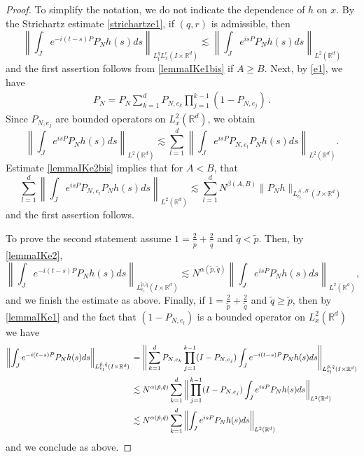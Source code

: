 \documentclass[aihp]{imsart}
\numberwithin{equation}{section}
\theoremstyle{plain}
\theoremstyle{remark}
\newcommand{\R}{\mathbb{R}}
\begin{document}
\begin{proof}
To simplify the notation, we do not indicate the dependence of $h$ on $x$. 
By the Strichartz estimate \eqref{strichartze1}, if $(q,r)$ is admissible, then
$$\left\|\int_J e^{-i(t-s) P} P_N h(s) ds\right\|_{L_t^q L_x^r (I\times \R^d)} \lesssim \left\|\int_J e^{is P } P_N h(s) ds\right\|_{L^2 (\R^d)} $$
and the first assertion follows from \eqref{lemmaIKe1bis} if $A \geq B$.
Next, by \eqref{e1}, we have
\begin{align*}
P_N 
= P_{N} \sum_{k = 1}^d P_{N, e_k} \prod_{j = 1}^{k - 1}(1 - P_{N, e_j}) \,.
\end{align*}
Since $P_{N,e_j}$ are bounded operators on $L^2_x (\R^d )$, we obtain  
$$
\left\|\int_J e^{is P } P_N h(s) ds\right\|_{L^2 (\R^d )} \lesssim \sum^{d}_{l=1}\left\|\int_J e^{is P} P_{N,e_l} P_N h(s) ds\right\|_{L^2 (\R^d )}.
$$
 Estimate \eqref{lemmaIKe2bis} implies that for $ A < B$, that 
$$\sum_{l=1}^d  \left\|\int_J e^{is P} P_{N,e_l} P_N h(s) ds \right\|_{L^2 (\R^d )} \lesssim \sum_{l=1}^d N^{\beta (A,B)} \|P_N h\|_{L_{e_l}^{A^\prime ,B^\prime} (J\times \R^d )}$$
and the first assertion follows. 


To prove the second statement assume $1= \frac{2}{\tilde{p}} +\frac{2}{\tilde{q}}$ and $\tilde{q} < \tilde{p}$. Then, by 
\eqref{lemmaIKe2}, 
\begin{equation}
\label{line1}
\left\|\int_J e^{-i(t-s) P} P_N h(s) ds \right\|_{L_{e_l}^{\tilde p, \tilde q} (I\times \R^d)}\lesssim N^{\alpha ( \tilde{p},\tilde q)}  \left\|\int_J e^{is P } P_N h(s) ds \right \|_{L^2 (\R^d)} ,
\end{equation}
and we finish the estimate as above. Finally, if $1= \frac{2}{\tilde{p}} +\frac{2}{\tilde{q}}$ and $\tilde{q} \geq \tilde{p}$, then by \eqref{lemmaIKe1} and the fact that $(1-P_{N,e_l})$ is a bounded operator on $L^2_x (\R^d )$ we have 
\begin{equation*}
\left\|\int_J e^{-i(t-s) P} P_N h(s) ds \right\|_{L_{e_l}^{\tilde p, \tilde q} (I\times \R^d)} \\
\begin{aligned}[t]
&=  \Bigg\| \sum_{k = 1}^d P_{N, e_k} \prod_{j = 1}^{k-1} (I - P_{N, e_{j}}) \int_J e^{-i(t -s) P } P_N h(s) ds \Bigg\|_{L_{e_l}^{\tilde p, \tilde q} (I\times \R^d)} \\
&\lesssim N^{\alpha ( \tilde{p},\tilde q)} \sum_{k = 1}^d  \bigg\|  \prod_{j = 1}^{k-1} (I - P_{N, e_{j}}) \int_J e^{is P } P_N h(s) ds \bigg \|_{L^2 (\R^d)} \\
&\lesssim N^{\alpha ( \tilde{p},\tilde q)} \sum_{k = 1}^d  \left\| \int_J e^{is P } P_N h(s) ds \right \|_{L^2 (\R^d)}
\end{aligned}
\end{equation*}
and we conclude as above. 
\end{proof}
\end{document}
